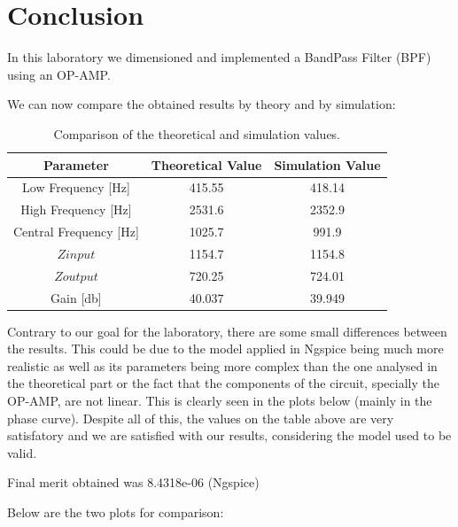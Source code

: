 \newpage
\section{Conclusion}
\label{sec:conclusion}

In this laboratory we dimensioned and implemented a BandPass Filter (BPF) using an OP-AMP.

We can now compare the obtained results by theory and by simulation:

\begin{table}[h]
    \centering
    \begin{tabular}{|c|c|c|}
    \hline
    {\bf Parameter} & {\bf Theoretical Value}& {\bf Simulation Value}\\
    \hline\hline
     Low Frequency [Hz] & 415.55 & 418.14\\
    \hline
    High Frequency [Hz] & 2531.6 & 2352.9\\
    \hline
   Central Frequency [Hz] & 1025.7 & 991.9\\
   \hline
     $Z{input}$ & 1154.7 & 1154.8 \\
    \hline
     $Z{output}$ & 720.25 & 724.01\\
    \hline
      Gain [db] & 40.037 & 39.949\\
    \hline
    \end{tabular}
    \caption{Comparison of the theoretical and simulation values.}
    \label{tab:values}
\end{table}

Contrary to our goal for the laboratory, there are some small differences between the results. This could be due to the model applied in Ngspice being much more realistic as well as its parameters being more complex than the one analysed in the theoretical part or the fact that the components of the circuit, specially the OP-AMP, are not linear. This is clearly seen in the plots below (mainly in the phase curve). 
Despite all of this, the values on the table above are very satisfatory and we are satisfied with our results, considering the model used to be valid.

Final merit obtained was 8.4318e-06 (Ngspice)

Below are the two plots for comparison:

